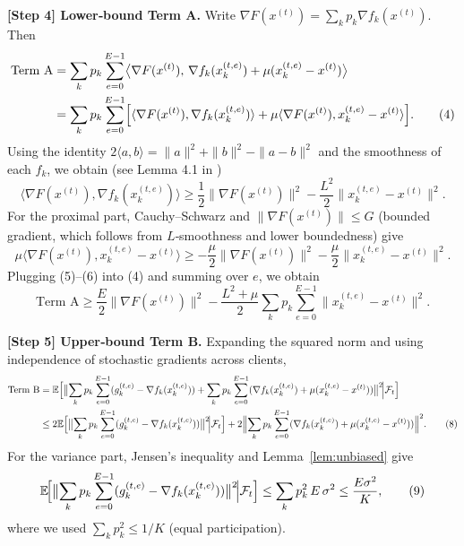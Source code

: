 \documentclass{article}
\newcommand{\E}{\mathbb{E}}
\begin{document}
\medskip
\noindent\textbf{[Step 4] Lower‑bound Term A.}  
Write $\nabla F(x^{(t)})=\sum_k p_k \nabla f_k(x^{(t)})$.
Then
\begin{align}
\text{Term A}
&=\sum_{k}p_k\sum_{e=0}^{E-1}
   \bigl\langle\nabla F(x^{(t)}),\,
          \nabla f_k(x_{k}^{(t,e)})+\mu(x_{k}^{(t,e)}-x^{(t)})\bigr\rangle \nonumber\\
&=\sum_{k}p_k\sum_{e=0}^{E-1}
   \Bigl[
        \langle\nabla F(x^{(t)}),\nabla f_k(x_{k}^{(t,e)})\rangle
        +\mu\langle\nabla F(x^{(t)}),x_{k}^{(t,e)}-x^{(t)}\rangle
   \Bigr]. \tag{4}
\end{align}
Using the identity $2\langle a,b\rangle = \|a\|^2+\|b\|^2-\|a-b\|^2$ and the
smoothness of each $f_k$, we obtain (see Lemma 4.1 in \cite{li2020federated})
\[
\langle\nabla F(x^{(t)}),\nabla f_k(x_{k}^{(t,e)})\rangle
\ge\frac{1}{2}\|\nabla F(x^{(t)})\|^2
      -\frac{L^2}{2}\|x_{k}^{(t,e)}-x^{(t)}\|^2 .
\tag{5}
\]
For the proximal part, Cauchy–Schwarz and $\| \nabla F(x^{(t)})\|\le G$ (bounded
gradient, which follows from $L$‑smoothness and lower boundedness) give
\[
\mu\langle\nabla F(x^{(t)}),x_{k}^{(t,e)}-x^{(t)}\rangle
\ge -\frac{\mu}{2}\|\nabla F(x^{(t)})\|^2
      -\frac{\mu}{2}\|x_{k}^{(t,e)}-x^{(t)}\|^2 .
\tag{6}
\]
Plugging (5)–(6) into (4) and summing over $e$, we obtain
\[
\text{Term A}
\ge
\frac{E}{2}\|\nabla F(x^{(t)})\|^2
-\frac{L^2+\mu}{2}\sum_{k}p_k\sum_{e=0}^{E-1}
   \|x_{k}^{(t,e)}-x^{(t)}\|^2 .
\tag{7}
\]

\medskip
\noindent\textbf{[Step 5] Upper‑bound Term B.}  
Expanding the squared norm and using independence of stochastic gradients across
clients,
\begin{align}
\text{Term B}
&=\E\Bigl[\bigl\|\sum_{k}p_k\sum_{e=0}^{E-1}
      (g_{k}^{(t,e)}-\nabla f_k(x_{k}^{(t,e)}) )
      +\sum_{k}p_k\sum_{e=0}^{E-1}
      (\nabla f_k(x_{k}^{(t,e)})+\mu(x_{k}^{(t,e)}-x^{(t)}))
      \bigr\|^{2}\!\Big|\mathcal{F}_t\Bigr] \nonumber\\
&\le 2\E\Bigl[\bigl\|\sum_{k}p_k\sum_{e=0}^{E-1}
      (g_{k}^{(t,e)}-\nabla f_k(x_{k}^{(t,e)}) )\bigr\|^{2}\!\Big|\mathcal{F}_t\Bigr]
   +2\Bigl\|\sum_{k}p_k\sum_{e=0}^{E-1}
      (\nabla f_k(x_{k}^{(t,e)})+\mu(x_{k}^{(t,e)}-x^{(t)}))\Bigr\|^{2}.
\tag{8}
\end{align}
For the variance part, Jensen’s inequality and Lemma~\ref{lem:unbiased} give
\[
\E\!\Bigl[\bigl\|\sum_{k}p_k\sum_{e=0}^{E-1}
      (g_{k}^{(t,e)}-\nabla f_k(x_{k}^{(t,e)}))\bigr\|^{2}\!\Big|\mathcal{F}_t\Bigr]
\le \sum_{k}p_k^{2}\,E\,\sigma^{2}
\le \frac{E\sigma^{2}}{K},
\tag{9}
\]
where we used $\sum_k p_k^2\le 1/K$ (equal participation).  
\end{document}
